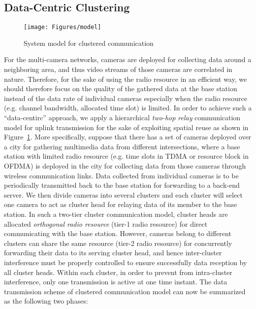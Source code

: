 \subsection{Data-Centric Clustering}
\label{sec::dcClustering}
%
\begin{figure}
\centering
\texttt{[image: Figures/model]}
\caption{\label{fig::dcModel}System model for clustered communication}
\end{figure}
%
For the multi-camera networks, cameras are deployed for collecting data around a neighboring area, and thus video streams of those cameras are correlated in nature.
Therefore, for the sake of using the radio resource in an efficient way, we should therefore focus on the quality of the gathered data at the base station instead of the data rate of individual cameras especially when the radio resource (e.g. channel bandwidth, allocated time slot) is limited.
In order to achieve such a ``data-centirc'' approach, we apply a hierarchical \emph{two-hop relay} communication model for uplink transmission for the sake of exploiting spatial reuse as shown in Figure~\ref{fig::dcModel}.
More specifically, suppose that there has a set of cameras deployed over a city for gathering multimedia data from different intersections, where a base station with limited radio resource (e.g. time slots in TDMA or resource block in OFDMA) is deployed in the city for collecting data from those cameras through wireless communication links.
Data collected from individual cameras is to be periodically transmitted back to the base station for forwarding to a back-end server.
We then divide cameras into several clusters and each cluster will select one camera to act as cluster head for relaying data of its member to the base station.
In such a two-tier cluster communication model, cluster heads are allocated \emph{orthogonal radio resource} (tier-1 radio resource) for direct communicating with the base station.
However, cameras belong to different clusters can share the same resource (tier-2 radio resource) for concurrently forwarding their data to its serving cluster head, and hence inter-cluster interference must be properly controlled to ensure successfully data reception by all cluster heads. 
Within each cluster, in order to prevent from intra-cluster interference, only one transmission is active at one time instant.
The data transmission scheme of clustered communication model can now be summarized as the following two phases:

